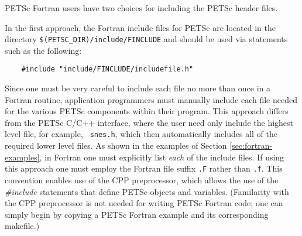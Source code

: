 PETSc Fortran users have two choices for including the PETSc header 
files. 

\medskip

In the first  approach, 
the Fortran include files for PETSc are located in the directory 
{\tt \$(PETSC\_DIR)/include/FINCLUDE} and should be used via statements 
such as the following:
\begin{verbatim}
    #include "include/FINCLUDE/includefile.h"
\end{verbatim}
Since one must be very careful to include each file no more than once
in a Fortran routine, application programmers must manually include
each file needed for the various PETSc components within their
program.  This approach differs from the PETSc C/C++ interface, where
the user need only include the highest level file, for example, {\tt
snes.h}, which then automatically includes all of the required lower
level files.  As shown in the examples of Section
\ref{sec:fortran-examples}, in Fortran one must explicitly list {\em
each} of the include files. If using this approach one must employ
the Fortran file suffix {\tt .F}
rather than {\tt .f}.  This convention enables use of the CPP
preprocessor, which allows the use of the {\em \#include} statements
that define PETSc objects and variables. (Familarity with the CPP
preprocessor is not needed for writing PETSc Fortran code; one can simply
begin by copying a PETSc Fortran example and its corresponding
makefile.)  

\medskip

